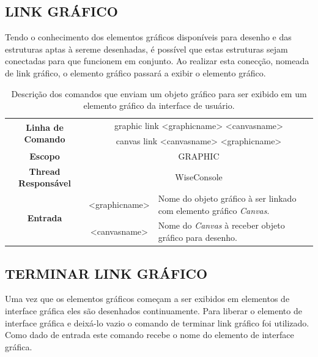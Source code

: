 \subsection{LINK GRÁFICO}\label{sec:graphic_link}

Tendo o conhecimento dos elementos gráficos disponíveis para desenho e das estruturas aptas à sereme desenhadas, é possível que estas estruturas sejam conectadas para que funcionem em conjunto. Ao realizar esta conecção, nomeada de link gráfico, o elemento gráfico passará a exibir o elemento gráfico.

\begin{center}
	\begin{table}[!htbp]
		\begin{tabular}{|c|c|m{}|}
			\hline
			\multirow{2}{*}{\textbf{Linha de Comando}} & \multicolumn{2}{c|}{graphic link <graphic\underline{\space\space}name> <canvas\underline{\space\space}name>} \\
			& \multicolumn{2}{c|}{canvas link <canvas\underline{\space\space}name> <graphic\underline{\space\space}name>} \\
			\hline
			\textbf{Escopo} & \multicolumn{2}{c|}{GRAPHIC} \\
			\hline
			\textbf{Thread Responsável} & \multicolumn{2}{c|}{WiseConsole} \\
			\hline
			\multirow{2}{*}{\textbf{Entrada}} &  <graphic\underline{\space\space}name> & Nome do objeto gráfico à ser linkado com elemento gráfico \textit{Canvas}. \\
			& <canvas\underline{\space\space}name> & Nome do \textit{Canvas} à receber objeto gráfico para desenho. \\
			\hline
		\end{tabular}
		\caption{Descrição dos comandos que enviam um objeto gráfico para ser exibido em um elemento gráfico da interface de usuário.}
		\label{tab:graphic_link}
	\end{table}
\end{center}

\subsection{TERMINAR LINK GRÁFICO}\label{sec:graphic_purge}

Uma vez que os elementos gráficos começam a ser exibidos em elementos de interface gráfica eles são desenhados continuamente. Para liberar o elemento de interface gráfica e deixá-lo vazio o comando de terminar link gráfico foi utilizado. Como dado de entrada este comando recebe o nome do elemento de interface gráfica.

